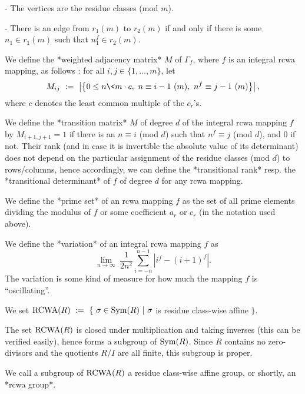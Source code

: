    \item{-} The vertices are the residue classes (mod $m$).

   \item{-} There is an edge from $r_1(m)$ to $r_2(m)$ if and only if
            there is some $n_1 \in r_1(m)$ such that
            $n_1^f \in r_2(m)$.

\endlist

We define the *weighted adjacency matrix* $M$  of $\Gamma_f$, where $f$
is an integral rcwa mapping, as follows : for all
$i,j \in \{1, \dots, m\}$, let
$$
  M_{ij} \ := \ 
  \left|
    \left\{
      0 \leq n \< m \cdot c, \
      n \equiv i-1 \ (m), \ n^f \equiv j-1 \ (m)
    \right\}
  \right|,
$$
where $c$ denotes the least common multiple of the $c_r$'s.

We define the *transition matrix* $M$ of degree $d$ of the integral rcwa
mapping $f$ by $M_{i+1,j+1} = 1$ if there is an $n \equiv i$
(mod $d$) such that $n^f \equiv j$ (mod $d$), and 0 if not.
Their rank (and in case it is invertible the absolute value of its 
determinant) does not depend on the particular assignment of the residue
classes (mod $d$) to rows/columns, hence accordingly, we can define the
*transitional rank* resp. the *transitional determinant* of $f$ of
degree $d$ for any rcwa mapping.

We define the *prime set* of an rcwa mapping $f$ as the set of all prime
elements dividing the modulus of $f$ or some coefficient $a_r$ or $c_r$
(in the notation used above).
 
We define the *variation* of an integral rcwa mapping $f$ as
$$
  \lim_{n \rightarrow \infty} \
  \frac{1}{2n^2} \sum_{i=-n}^{n-1} \left| i^f - (i+1)^f \right|.
$$
The variation is some kind of measure for how much the mapping $f$ is
``oscillating''.

We set ${\rm RCWA}(R) \ := \ \{ \ \sigma \in {\rm Sym}(R) \ | \ \sigma$
is residue class-wise affine $\}$.

The set ${\rm RCWA}(R)$ is closed under multiplication and taking
inverses (this can be verified easily), hence forms a subgroup of
${\rm Sym}(R)$.
Since $R$ contains no zero-divisors and the quotients $R/I$ are
all finite, this subgroup is proper.

\index{rcwa group!definition}
We call a subgroup of ${\rm RCWA}(R)$ a residue class-wise affine group,
or shortly, an *rcwa group*.

